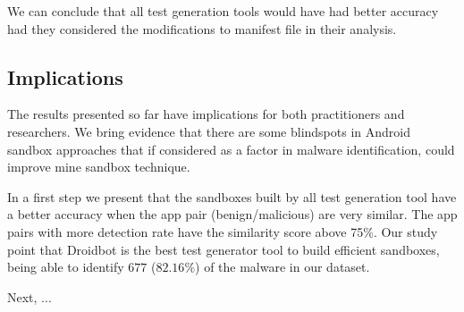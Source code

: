 \begin{obs}{3}{}
 We can conclude that all test generation tools  would have had better accuracy had they considered the modifications to manifest file in their analysis. 
\end{obs}

\subsection{Implications}\label{sec:implications}

The results presented so far have implications for both practitioners and researchers. We bring evidence that there are some blindspots in Android sandbox approaches that if considered as a factor in malware identification, could improve mine sandbox technique. 

In a first step we present that the sandboxes built by all test generation tool have a better accuracy when the app pair (benign/malicious) are very similar. The app pairs with more detection rate have the similarity score above 75\%. Our study point that Droidbot is the best test generator tool to build efficient sandboxes, being able to identify $677$ ($82.16$\%) of the malware in our dataset.

Next, ...


